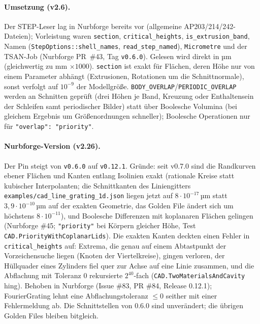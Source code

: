 \paragraph{Umsetzung (v2.6).} Der STEP-Leser lag in Nurbforge bereits vor (allgemeine AP203/214/242-Dateien);
Vorleistung waren \verb|section|, \verb|critical_heights|, \verb|is_extrusion_band|, Namen
(\verb|StepOptions::shell_names|, \verb|read_step_named|), \verb|Micrometre| und der TSAN-Job (Nurbforge PR~\#43,
Tag \verb|v0.6.0|). Gelesen wird direkt in µm (gleichwertig zu mm $\times1000$). \verb|section| ist exakt für Flächen,
deren Höhe nur von einem Parameter abhängt (Extrusionen, Rotationen um die Schnittnormale), sonst verfolgt auf
$10^{-9}$ der Modellgröße. \verb|BODY_OVERLAP|/\verb|PERIODIC_OVERLAP| werden an Schnitten geprüft (drei Höhen je Band,
Kreuzung oder Enthaltensein der Schleifen samt periodischer Bilder) statt über Boolesche Volumina (bei gleichem
Ergebnis um Größenordnungen schneller); Boolesche Operationen nur für \verb|"overlap": "priority"|.

\paragraph{Nurbforge-Version (v2.26).} Der Pin steigt von \verb|v0.6.0| auf \verb|v0.12.1|. Gründe: seit v0.7.0 sind
die Randkurven ebener Flächen und Kanten entlang Isolinien exakt (rationale Kreise statt kubischer Interpolanten;
die Schnittkanten des Liniengitters \verb|examples/cad_line_grating_1d.json| liegen jetzt auf $8\cdot10^{-17}$\,µm
statt $3{,}9\cdot10^{-10}$\,µm auf der exakten Geometrie, das Golden File ändert sich um höchstens $8\cdot10^{-11}$), und
Boolesche Differenzen mit koplanaren Flächen gelingen (Nurbforge \#45; \verb|"priority"| bei Körpern gleicher Höhe,
Test \verb|CAD.PriorityWithCoplanarLids|). Die exakten Kanten deckten einen Fehler in \verb|critical_heights| auf:
Extrema, die genau auf einem Abtastpunkt der Vorzeichensuche liegen (Knoten der Viertelkreise), gingen verloren, der
Hüllquader eines Zylinders fiel quer zur Achse auf eine Linie zusammen, und die Abflachung mit Toleranz 0 rekursierte
$2^{40}$-fach (\verb|CAD.TwoMaterialsAndCavity| hing). Behoben in Nurbforge (Issue \#83, PR \#84, Release 0.12.1);
FourierGrating lehnt eine Abflachungstoleranz $\le0$ seither mit einer Fehlermeldung ab. Die Schnittstellen von
0.6.0 sind unverändert; die übrigen Golden Files bleiben bitgleich.

